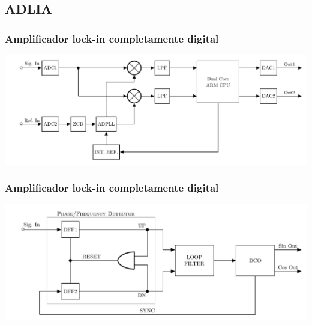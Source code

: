 \documentclass{beamer}
\begin{document}
\subsection{ADLIA}
\begin{frame}
\frametitle{Amplificador lock-in completamente digital}
\begin{block}{}
\begin{center}
\includegraphics[width=\textwidth]{diagrama_en_bloques}
\end{center}
\end{block}
\end{frame} 

\begin{frame}
\frametitle{Amplificador lock-in completamente digital}
\begin{block}{}
\begin{center}
\includegraphics[width=\textwidth]{adpll}
\end{center}
\end{block}
\end{frame} 
\end{document}
